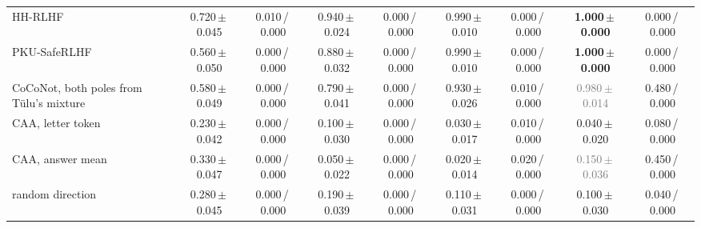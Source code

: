 \begin{tabular}{@{}lcccccccc@{}}
HH-RLHF & 0.720\,{\scriptsize$\pm$\,0.045} & {\scriptsize 0.010\,/\,0.000} & 0.940\,{\scriptsize$\pm$\,0.024} & {\scriptsize 0.000\,/\,0.000} & 0.990\,{\scriptsize$\pm$\,0.010} & {\scriptsize 0.000\,/\,0.000} & \textbf{1.000\,{\scriptsize$\pm$\,0.000}} & {\scriptsize 0.000\,/\,0.000} \\
PKU-SafeRLHF & 0.560\,{\scriptsize$\pm$\,0.050} & {\scriptsize 0.000\,/\,0.000} & 0.880\,{\scriptsize$\pm$\,0.032} & {\scriptsize 0.000\,/\,0.000} & 0.990\,{\scriptsize$\pm$\,0.010} & {\scriptsize 0.000\,/\,0.000} & \textbf{1.000\,{\scriptsize$\pm$\,0.000}} & {\scriptsize 0.000\,/\,0.000} \\
CoCoNot, both poles from T\"ulu's mixture & 0.580\,{\scriptsize$\pm$\,0.049} & {\scriptsize 0.000\,/\,0.000} & 0.790\,{\scriptsize$\pm$\,0.041} & {\scriptsize 0.000\,/\,0.000} & 0.930\,{\scriptsize$\pm$\,0.026} & {\scriptsize 0.010\,/\,0.000} & \textcolor{gray}{0.980\,{\scriptsize$\pm$\,0.014}} & {\scriptsize 0.480\,/\,0.000} \\
CAA, letter token & 0.230\,{\scriptsize$\pm$\,0.042} & {\scriptsize 0.000\,/\,0.000} & 0.100\,{\scriptsize$\pm$\,0.030} & {\scriptsize 0.000\,/\,0.000} & 0.030\,{\scriptsize$\pm$\,0.017} & {\scriptsize 0.010\,/\,0.000} & 0.040\,{\scriptsize$\pm$\,0.020} & {\scriptsize 0.080\,/\,0.000} \\
CAA, answer mean & 0.330\,{\scriptsize$\pm$\,0.047} & {\scriptsize 0.000\,/\,0.000} & 0.050\,{\scriptsize$\pm$\,0.022} & {\scriptsize 0.000\,/\,0.000} & 0.020\,{\scriptsize$\pm$\,0.014} & {\scriptsize 0.020\,/\,0.000} & \textcolor{gray}{0.150\,{\scriptsize$\pm$\,0.036}} & {\scriptsize 0.450\,/\,0.000} \\
random direction & 0.280\,{\scriptsize$\pm$\,0.045} & {\scriptsize 0.000\,/\,0.000} & 0.190\,{\scriptsize$\pm$\,0.039} & {\scriptsize 0.000\,/\,0.000} & 0.110\,{\scriptsize$\pm$\,0.031} & {\scriptsize 0.000\,/\,0.000} & 0.100\,{\scriptsize$\pm$\,0.030} & {\scriptsize 0.040\,/\,0.000} \\
\bottomrule
\end{tabular}
